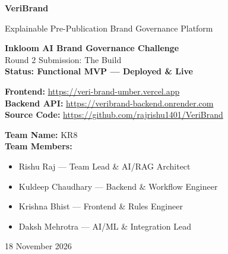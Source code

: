 \documentclass[11pt,a4paper]{article}
\begin{document}
\begin{titlepage}
    \centering
    \vspace*{2cm}

    {\Huge\bfseries\color{primaryblue} VeriBrand\par}
    \vspace{0.5cm}
    {\Large Explainable Pre-Publication Brand Governance Platform\par}
    \vspace{2cm}

    \begin{tcolorbox}[colback=lightgray, colframe=primaryblue, width=0.8\textwidth, arc=3mm, boxrule=1pt]
    \centering
    \textbf{Inkloom AI Brand Governance Challenge}\\
    \vspace{0.3cm}
    Round 2 Submission: The Build\\
    \vspace{0.3cm}
    \textbf{Status: Functional MVP --- Deployed \& Live}
    \end{tcolorbox}

    \vspace{1cm}

    \begin{tcolorbox}[colback=successgreen!10, colframe=successgreen, width=0.8\textwidth, arc=2mm, boxrule=0.5pt, title=\textbf{Live URLs}]
    \textbf{Frontend:} \url{https://veri-brand-umber.vercel.app}\\
    \textbf{Backend API:} \url{https://veribrand-backend.onrender.com}\\
    \textbf{Source Code:} \url{https://github.com/rajrishu1401/VeriBrand}
    \end{tcolorbox}

    \vfill

    \begin{tcolorbox}[colback=white, colframe=darkgray, width=0.8\textwidth, arc=2mm, boxrule=0.5pt]
    \textbf{Team Name:} KR8\\
    \vspace{0.3cm}
    \textbf{Team Members:}
    \begin{itemize}[leftmargin=2cm]
        \item Rishu Raj --- Team Lead \& AI/RAG Architect
        \item Kuldeep Chaudhary --- Backend \& Workflow Engineer
        \item Krishna Bhist --- Frontend \& Rules Engineer
        \item Daksh Mehrotra --- AI/ML \& Integration Lead
    \end{itemize}
    \end{tcolorbox}

    \vspace{1cm}
    {\large 18 November 2026\par}
\end{titlepage}
\end{document}
